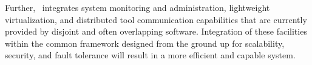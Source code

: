 Further, \flux\ integrates system monitoring and
administration, lightweight virtualization, 
and distributed tool communication capabilities 
that are currently provided by disjoint
and often overlapping software. 
Integration of these facilities within the common framework
designed from the ground up for scalability, security,
and fault tolerance will result in a more efficient
and capable system.

\ifcomments
{}

\ifcomments
{}

\ifcomments
{}

\ifcomments
{}

